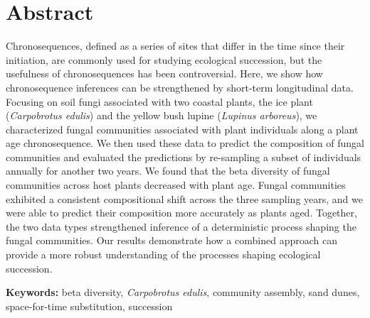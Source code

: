 \section{Abstract}
Chronosequences, defined as a series of sites that differ in the time since their initiation, are commonly used for studying ecological succession, but the usefulness of chronosequences has been controversial. Here, we show how chronosequence inferences can be strengthened by short-term longitudinal data.
Focusing on soil fungi associated with two coastal plants, the ice plant (\textit{Carpobrotus edulis}) and the yellow bush lupine (\textit{Lupinus arboreus}), we characterized fungal communities associated with plant individuals along a plant age chronosequence. 
We then used these data to predict the composition of fungal communities and evaluated the predictions by re-sampling a subset of individuals annually for another two years.
We found that the beta diversity of fungal communities across host plants decreased with plant age. Fungal communities exhibited a consistent compositional shift across the three sampling years, and we were able to predict their composition more accurately as plants aged. Together, the two data types strengthened inference of a deterministic process shaping the fungal communities. Our results demonstrate how a combined approach can provide a more robust understanding of the processes shaping ecological succession.
\medskip


\textbf{Keywords:} beta diversity, \textit{Carpobrotus edulis}, community assembly, sand dunes, space-for-time substitution, succession



